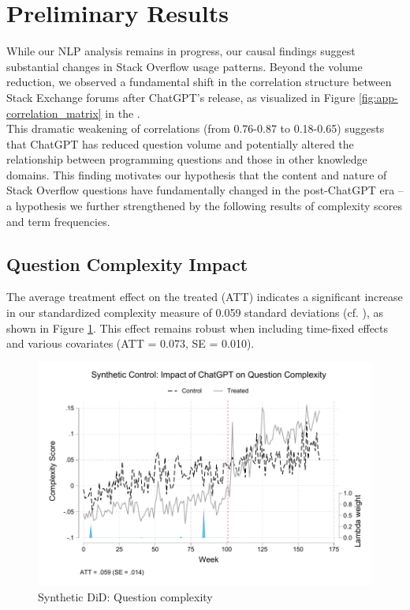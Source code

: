 \section{Preliminary Results}
While our NLP analysis remains in progress, our causal findings suggest substantial changes in Stack Overflow usage patterns. Beyond the volume reduction, we observed a fundamental shift in the correlation structure between Stack Exchange forums after ChatGPT's release, as visualized in Figure \ref{fig:app-correlation_matrix} in the .\\

This dramatic weakening of correlations (from 0.76-0.87 to 0.18-0.65) suggests that ChatGPT has reduced question volume and potentially altered the relationship between programming questions and those in other knowledge domains. This finding motivates our hypothesis that the content and nature of Stack Overflow questions have fundamentally changed in the post-ChatGPT era -- a hypothesis we further strengthened by the following results of complexity scores and term frequencies.


\subsection{Question Complexity Impact}

The average treatment effect on the treated (ATT) indicates a significant increase in our standardized complexity measure of 0.059 standard deviations (cf. ), as shown in Figure \ref{fig:cscore_synthetic_control}. This effect remains robust when including time-fixed effects and various covariates (ATT = 0.073, SE = 0.010).  

\begin{figure}[H]
    \centering
    \includegraphics[width=1\linewidth]{imgs/stata/sdid_nlp_trends101.pdf}
    \caption{Synthetic DiD: Question complexity}
    \label{fig:cscore_synthetic_control}
\end{figure}

